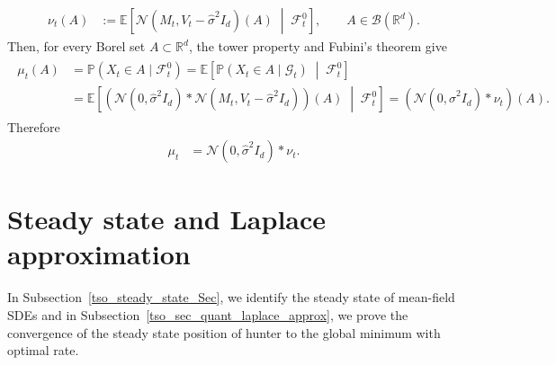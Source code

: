 \documentclass{article}
\numberwithin{equation}{section}
\begin{document}
\begin{align}
\nu_t(A) &:= \mathbb E\left[ \mathcal N(M_t,V_t-\hat{\sigma}^2I_d)(A) \;\middle|\; \mathcal{F}^0_t \right], \qquad A\in\mathcal B(\mathbb R^d).
\end{align}
Then, for every Borel set $A\subset\mathbb R^d$, the tower property and Fubini's theorem give
\begin{align}
\begin{aligned}
\mu_t(A) &= \mathbb P(X_t\in A\mid\mathcal{F}^0_t) = \mathbb E\left[ \mathbb P(X_t\in A\mid\mathcal G_t) \;\middle|\; \mathcal{F}^0_t \right] \\
&= \mathbb E\left[ \left( \mathcal N(0,\hat{\sigma}^2I_d) * \mathcal N(M_t,V_t-\hat{\sigma}^2I_d) \right)(A) \;\middle|\; \mathcal{F}^0_t \right] = \left( \mathcal N(0,\hat{\sigma}^2I_d) * \nu_t \right)(A).
\end{aligned}
\end{align}
Therefore
\begin{align}
\mu_t &= \mathcal N(0,\hat{\sigma}^2I_d) * \nu_t .
\end{align}







\section{Steady state and Laplace approximation}\label{tso_steady_state_subsec} 
In Subsection~\ref{tso_steady_state_Sec}, we identify the steady state of mean-field SDEs and in  Subsection~\ref{tso_sec_quant_laplace_approx}, we prove the convergence of the steady state position of hunter to the global minimum with optimal rate. 
\end{document}
